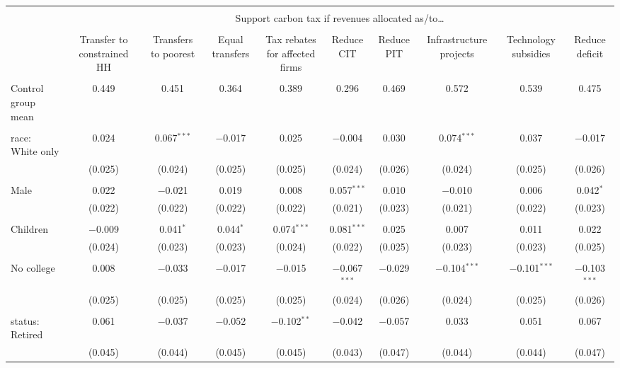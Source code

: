 
\begin{tabular}{@{\extracolsep{5pt}}lccccccccc} 
\\[-1.8ex]\hline 
\hline \\[-1.8ex] 
 & \multicolumn{9}{c}{Support carbon tax if revenues allocated as/to…} \\ 
\cline{2-10} 
\\[-1.8ex] & Transfer to constrained HH & Transfers to poorest & Equal transfers & Tax rebates for affected firms & Reduce CIT & Reduce PIT & Infrastructure projects & Technology subsidies & Reduce deficit \\ 
\hline \\[-1.8ex] 
 Control group mean & 0.449 & 0.451 & 0.364 & 0.389 & 0.296 & 0.469 & 0.572 & 0.539 & 0.475  \\ \hline \\[-1.8ex] race: White only & 0.024 & 0.067$^{***}$ & $-$0.017 & 0.025 & $-$0.004 & 0.030 & 0.074$^{***}$ & 0.037 & $-$0.017 \\ 
  & (0.025) & (0.024) & (0.025) & (0.025) & (0.024) & (0.026) & (0.024) & (0.025) & (0.026) \\ 
  & & & & & & & & & \\ 
 Male & 0.022 & $-$0.021 & 0.019 & 0.008 & 0.057$^{***}$ & 0.010 & $-$0.010 & 0.006 & 0.042$^{*}$ \\ 
  & (0.022) & (0.022) & (0.022) & (0.022) & (0.021) & (0.023) & (0.021) & (0.022) & (0.023) \\ 
  & & & & & & & & & \\ 
 Children & $-$0.009 & 0.041$^{*}$ & 0.044$^{*}$ & 0.074$^{***}$ & 0.081$^{***}$ & 0.025 & 0.007 & 0.011 & 0.022 \\ 
  & (0.024) & (0.023) & (0.023) & (0.024) & (0.022) & (0.025) & (0.023) & (0.023) & (0.025) \\ 
  & & & & & & & & & \\ 
 No college & 0.008 & $-$0.033 & $-$0.017 & $-$0.015 & $-$0.067$^{***}$ & $-$0.029 & $-$0.104$^{***}$ & $-$0.101$^{***}$ & $-$0.103$^{***}$ \\ 
  & (0.025) & (0.025) & (0.025) & (0.025) & (0.024) & (0.026) & (0.024) & (0.025) & (0.026) \\ 
  & & & & & & & & & \\ 
 status: Retired & 0.061 & $-$0.037 & $-$0.052 & $-$0.102$^{**}$ & $-$0.042 & $-$0.057 & 0.033 & 0.051 & 0.067 \\ 
  & (0.045) & (0.044) & (0.045) & (0.045) & (0.043) & (0.047) & (0.044) & (0.044) & (0.047) \\ 

\end{tabular}
